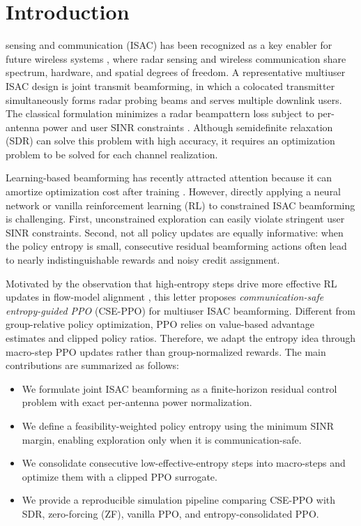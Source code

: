 \documentclass[10pt,journal]{IEEEtran}
\begin{document}
\section{Introduction}
 sensing and communication (ISAC) has been
recognized as a key enabler for future wireless systems \cite{liu2022isacsurvey}, where radar
sensing and wireless communication share spectrum, hardware, and spatial
degrees of freedom. A representative multiuser ISAC design is joint
transmit beamforming, in which a colocated transmitter simultaneously
forms radar probing beams and serves multiple downlink users. The classical
formulation minimizes a radar beampattern loss subject to per-antenna
power and user SINR constraints \cite{liu2020joint}. Although semidefinite
relaxation (SDR) can solve this problem with high accuracy, it requires an
optimization problem to be solved for each channel realization.

Learning-based beamforming has recently attracted attention because it can
amortize optimization cost after training \cite{zhao2025learning}. However,
directly applying a neural network or vanilla reinforcement learning (RL)
to constrained ISAC beamforming is challenging. First, unconstrained
exploration can easily violate stringent user SINR constraints. Second,
not all policy updates are equally informative: when the policy entropy is
small, consecutive residual beamforming actions often lead to nearly
indistinguishable rewards and noisy credit assignment.

Motivated by the observation that high-entropy steps drive more effective
RL updates in flow-model alignment \cite{zhang2026egrpo}, this letter
proposes \emph{communication-safe entropy-guided PPO} (CSE-PPO) for
multiuser ISAC beamforming. Different from group-relative policy
optimization, PPO relies on value-based advantage estimates and clipped
policy ratios. Therefore, we adapt the entropy idea through
macro-step PPO updates rather than group-normalized rewards. The main
contributions are summarized as follows:
\begin{itemize}
  \item We formulate joint ISAC beamforming as a finite-horizon residual
  control problem with exact per-antenna power normalization.
  \item We define a feasibility-weighted policy entropy using the minimum
  SINR margin, enabling exploration only when it is communication-safe.
  \item We consolidate consecutive low-effective-entropy steps into
  macro-steps and optimize them with a clipped PPO surrogate.
  \item We provide a reproducible simulation pipeline comparing CSE-PPO
  with SDR, zero-forcing (ZF), vanilla PPO, and entropy-consolidated PPO.
\end{itemize}
\end{document}

